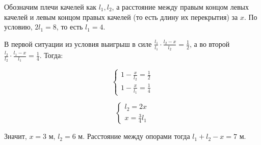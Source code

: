 Обозначим плечи качелей как $l_1, l_2$, а расстояние между правым концом левых качелей и левым концом правых качелей (то есть длину их перекрытия) за $x$. По условию, $2l_1 = 8$, то есть $l_1 = 4$.

В первой ситуации из условия выигрыш в силе $\frac{l_1}{l_1}\cdot\frac{l_2 - x}{l_2} = \frac12$, а во второй $\frac{l_2}{l_2}\cdot\frac{l_1 - x}{l_1} = \frac14$. Тогда:

\begin{equation}
\left\{\begin{aligned}
1 - \frac x{l_2} = \frac12\\
1 - \frac x{l_1} = \frac14
\end{aligned}\right.
\end{equation}

\begin{equation}
\left\{\begin{aligned}
l_2 = 2x\\
x = \frac34l_1
\end{aligned}\right.
\end{equation}

Значит, $x = 3$ м, $l_2 = 6$ м. Расстояние между опорами тогда $l_1 + l_2 - x = 7$ м.